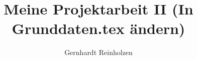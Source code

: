 
\title{Meine Projektarbeit II (In Grunddaten.tex ändern)}
\author{Gernhardt Reinholzen}

\newcommand{\Kurs}{WI13C}
\newcommand{\guardian}{Prof. David R. Hart}
\newcommand{\company}{mongoloid GmBH}

 